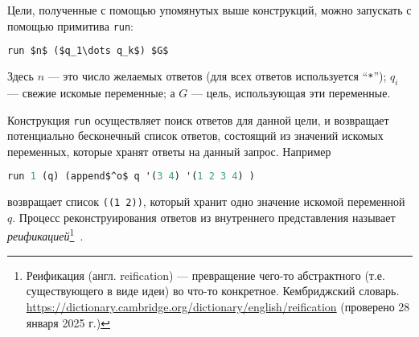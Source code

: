 Цели, полученные с помощью упомянутых выше конструкций, можно запускать с помощью примитива \lstinline|run|:

\begin{lstlisting}[mathescape=true,language=scheme]
   run $n$ ($q_1\dots q_k$) $G$
\end{lstlisting}

\noindent Здесь $n$ --- это число желаемых ответов (для всех ответов используется \enquote{\texttt{*}}); $q_i$ --- свежие искомые переменные; а $G$ --- цель, использующая эти переменные.


Конструкция \lstinline|run| осуществляет поиск ответов для данной цели, и возвращает потенциально бесконечный список ответов, состоящий из значений искомых переменных, которые хранят ответы на данный запрос. Например

\begin{lstlisting}[mathescape=true,language=scheme]
   run 1 (q) (append$^o$ q '(3 4) '(1 2 3 4) )
\end{lstlisting}

\noindent возвращает список \lstinline|((1 2))|, который хранит одно значение искомой переменной $q$.
Процесс реконструирования ответов из внутреннего представления называет \emph{реификацией}\footnote{Реификация (англ. reification) --- превращение чего-то абстрактного (т.е. существующего в виде идеи) во что-то конкретное. Кембриджский словарь. \url{https://dictionary.cambridge.org/dictionary/english/reification} (проверено 28 января 2025 г.)}~\cite{WillThesis}.

